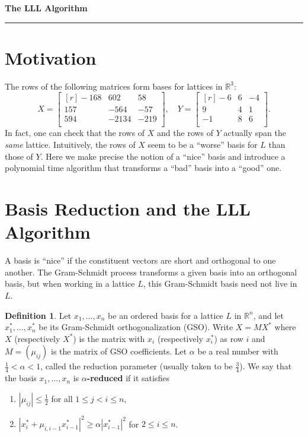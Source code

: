 \documentclass[11pt,letterpaper]{article}
\newcommand{\reals}{\mathbb{R}}
\theoremstyle{definition}
\newtheorem{definition}{Definition}[section]
\begin{document}
\begin{center}
{\bf \Large The LLL Algorithm} %
\vspace{0.2cm}
\hrule
\end{center}
%	
\section{Motivation}
The rows of the following matrices form bases for lattices in $\reals^3$:
\[
X = \begin{bmatrix*}[r]
	-168 & 602 & 58\\
	157 & -564 & -57\\
	594 & -2134 & -219\\
\end{bmatrix*}, \quad
Y = \begin{bmatrix*}[r]
	-6 & 6 & -4\\
	9 & 4 & 1\\
	-1 & 8 & 6\\
\end{bmatrix*}.
\]
In fact, one can check that the rows of $X$ and the rows of $Y$ actually span the \textit{same} lattice. Intuitively, the rows of $X$ seem to be a ``worse'' basis for $L$ than those of $Y$. Here we make precise the notion of a ``nice'' basis and introduce a polynomial time algorithm that transforms a ``bad'' basis into a ``good'' one. 

\section{Basis Reduction and the LLL Algorithm}
A basis is ``nice'' if the constituent vectors are short and orthogonal to one another. The Gram-Schmidt process transforms a given basis into an orthogonal basis, but when working in a lattice $L$, this Gram-Schmidt basis need not live in $L$.
\begin{definition}
	Let $x_1, \ldots, x_n$ be an ordered basis for a lattice $L$ in $\reals^n$, and let $x_1^*, \ldots, x_n^*$ be its Gram-Schmidt orthogonalization (GSO). Write $X = MX^*$ where $X$ (respectively $X^*$) is the matrix with $x_i$ (respectively $x_i^*$) as row $i$ and $M = (\mu_{ij})$ is the matrix of GSO coefficients. Let $\alpha$ be a real number with $\frac{1}{4}<\alpha<1$, called the reduction parameter (usually taken to be $\frac{3}{4}$). We say that the basis $x_1, \ldots, x_n$ is \textbf{$\alpha$-reduced} if it satisfies
	\begin{enumerate}
		\item $|\mu_{ij}|\leq \frac{1}{2}$ for all $1\leq j<i\leq n$,
		\item $|x_i^* + \mu_{i, i-1}x_{i-1}^*|^2 \geq \alpha|x_{i-1}^*|^2$ for $2\leq i\leq n$.
	\end{enumerate}
\end{definition}
\end{document}
